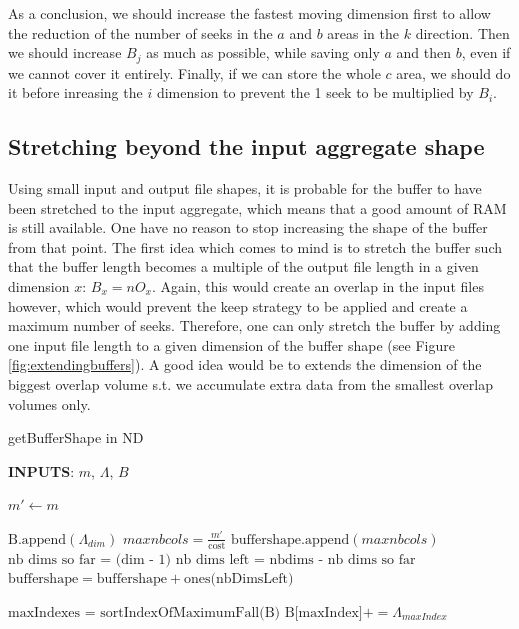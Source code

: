 \documentclass[conference]{IEEEtran}
\begin{document}
As a conclusion, we should increase the fastest moving dimension first to allow the reduction of the number of seeks in the $a$ and $b$ areas in the $k$ direction.
Then we should increase $B_j$ as much as possible, while saving only $a$ and then $b$, even if we cannot cover it entirely.
Finally, if we can store the whole $c$ area, we should do it before inreasing the $i$ dimension to prevent the 1 seek to be multiplied by $B_i$. \\

\subsection{Stretching beyond the input aggregate shape}
Using small input and output file shapes, it is probable for the buffer to have been stretched to the input aggregate, which means that a good amount of RAM is still available.
One have no reason to stop increasing the shape of the buffer from that point.
The first idea which comes to mind is to stretch the buffer such that the buffer length becomes a multiple of the output file length in a given dimension $x$: $B_x = nO_x$.
Again, this would create an overlap in the input files however, which would prevent the keep strategy to be applied and create a maximum number of seeks.
Therefore, one can only stretch the buffer by adding one input file length to a given dimension of the buffer shape (see Figure \ref{fig:extendingbuffers}).
A good idea would be to extends the dimension of the biggest overlap volume s.t. we accumulate extra data from the smallest overlap volumes only.

\begin{algorithm}[H]
  \caption{getBufferShape in ND}

  \begin{algorithmic}[1]

    \STATE \textbf{INPUTS}: $m$, $\Lambda$, $B$

    \STATE $m' \gets m$

        \STATE $\textrm{B.append}(\Lambda_{dim})$
      \ENDIF
        \STATE $maxnbcols = \frac{m'}{\textrm{cost}}$
	      \STATE $\textrm{buffershape.append}(maxnbcols)$
      \ENDIF
        \STATE $\textrm{nb dims so far = (dim - 1)}$
        \STATE $\textrm{nb dims left = nbdims - nb dims so far}$
        \STATE $\textrm{buffershape} = \textrm{buffershape} + \textrm{ones(nbDimsLeft)}$
      \ENDIF
    \ENDFOR

    \STATE $\textrm{maxIndexes = sortIndexOfMaximumFall(B)}$ %
        \STATE $\textrm{B[maxIndex]} += \Lambda_{maxIndex}$
      \ENDWHILE
    \ENDFOR

  \end{algorithmic}
  \label{algo:getbuffershape}

\end{algorithm}
\end{document}

